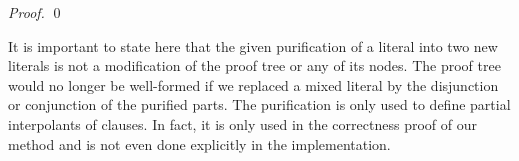 \begin{techreport}
\begin{proof}
    \vspace{-19pt}\strut
    \fi\qed
  \end{proof}
\end{techreport}

It is important to state here that the given purification of a
literal into two new literals is not a modification of the proof tree
or any of its nodes. The proof tree would no longer be well-formed if
we replaced a mixed literal by the disjunction or conjunction of the
purified parts.  The purification is only used to define partial
interpolants of clauses.  In fact, it is only used in the
correctness proof of our method and is not even done explicitly in the
implementation.
